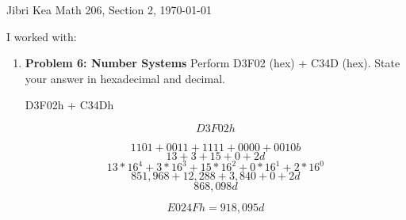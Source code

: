 \documentclass[12pt]{article}  %
\begin{document}

{\Large Jibri Kea} \hfill
{\large Math 206, Section 2,}  %
\hfill  \today

I worked with:


\begin{enumerate}
\item  \textbf{Problem 6: Number Systems} Perform D3F02 (hex) + C34D (hex). State your answer in hexadecimal and decimal.


D3F02h + C34Dh

\[ D		 3		 F		 0		 2 		h\]

\[1101 +	0011 +	1111 +	0000 +	0010	b\]
\[ 13	+	 3 	 +	 15   +	 0	 +	 2		d\]
\[13*16^{4} + 3*16^{3}  +  15*16^{2}  + 0*16^{1}  + 2*16^{0}\]
\[851,968 + 12,288 + 3,840 + 0 + 2d\]
\[868,098d\]


\[E024Fh = 918,095d\]


\end{enumerate}
\end{document}
